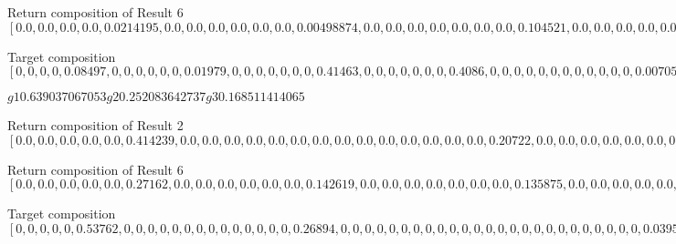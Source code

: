 Return composition of Result 6
$[0.0, 0.0, 0.0, 0.0, 0.0214195, 0.0, 0.0, 0.0, 0.0, 0.0, 0.0, 0.00498874, 0.0, 0.0, 0.0, 0.0, 0.0, 0.0, 0.0, 0.104521, 0.0, 0.0, 0.0, 0.0, 0.0, 0.0, 0.0, 0.103001, 0.0, 0.0, 0.0, 0.0, 0.0, 0.0, 0.0, 0.0, 0.0, 0.0, 0.0, 0.0, 0.00177719, 0.0, 0.0, 0.0, 0.0, 0.0, 0.0163754, 0.0, 0.0, 0.0, 0.0, 0.0, 0.0, 0.0, 0.747916]$

Target composition
$[0, 0, 0, 0, 0.08497, 0, 0, 0, 0, 0, 0, 0.01979, 0, 0, 0, 0, 0, 0, 0, 0.41463, 0, 0, 0, 0, 0, 0, 0, 0.4086, 0, 0, 0, 0, 0, 0, 0, 0, 0, 0, 0, 0, 0.00705, 0, 0, 0, 0, 0, 0.06496, 0, 0, 0, 0, 0, 0, 0]$

$g1 0.639037067053 g2 0.252083642737 g3 0.168511414065$





Return composition of Result 2
$[0.0, 0.0, 0.0, 0.0, 0.0, 0.414239, 0.0, 0.0, 0.0, 0.0, 0.0, 0.0, 0.0, 0.0, 0.0, 0.0, 0.0, 0.0, 0.0, 0.0, 0.20722, 0.0, 0.0, 0.0, 0.0, 0.0, 0.0, 0.0, 0.0, 0.0, 0.0, 0.0, 0.0, 0.0, 0.0, 0.0, 0.0, 0.0, 0.0, 0.0, 0.0, 0.0, 0.0, 0.0304427, 0.0, 0.0, 0.0, 0.0, 0.0, 0.0, 0.0, 0.0, 0.0, 0.0, 0.0, 0.0, 0.0876989, 0.0, 0.0, 0.0, 0.0, 0.0, 0.0, 0.0, 0.0, 0.0, 0.0, 0.0, 0.0, 0.0, 0.0, 0.0, 0.0, 0.0, 0.0, 0.0, 0.0123589, 0.0, 0.0, 0.0, 0.0, 0.0, 0.0, 0.0, 0.0, 0.0, 0.0, 0.0, 0.0, 0.0, 0.0, 0.0, 0.0185461, 0.0, 0.0, 0.0, 0.0, 0.0, 0.0, 0.0, 0.0, 0.0, 0.0, 0.0, 0.0, 0.0, 0.0, 0.0, 0.229495]$

Return composition of Result 6
$[0.0, 0.0, 0.0, 0.0, 0.0, 0.27162, 0.0, 0.0, 0.0, 0.0, 0.0, 0.0, 0.142619, 0.0, 0.0, 0.0, 0.0, 0.0, 0.0, 0.0, 0.135875, 0.0, 0.0, 0.0, 0.0, 0.0, 0.0, 0.0, 0.0, 0.0, 0.0, 0.0, 0.0, 0.0713442, 0.0, 0.0, 0.0, 0.0, 0.0, 0.0, 0.0, 0.0, 0.0, 0.0104812, 0.0, 0.0, 0.0199615, 0.0, 0.0, 0.0, 0.0, 0.0, 0.0, 0.0, 0.0, 0.0, 0.0301941, 0.0, 0.0, 0.0, 0.0, 0.0, 0.0, 0.0, 0.0, 0.0, 0.0, 0.0, 0.0, 0.0575048, 0.0, 0.0, 0.0, 0.0, 0.0, 0.0, 0.00810383, 0.0, 0.0, 0.0, 0.0, 0.0, 0.0, 0.0, 0.0, 0.00425508, 0.0, 0.0, 0.0, 0.0, 0.0, 0.0, 0.0121608, 0.0, 0.0, 0.0, 0.0, 0.0, 0.0, 0.0, 0.0, 0.0, 0.0, 0.0, 0.0, 0.00638527, 0.0, 0.0, 0.229495]$

Target composition
$[0, 0, 0, 0, 0, 0.53762, 0, 0, 0, 0, 0, 0, 0, 0, 0, 0, 0, 0, 0, 0, 0.26894, 0, 0, 0, 0, 0, 0, 0, 0, 0, 0, 0, 0, 0, 0, 0, 0, 0, 0, 0, 0, 0, 0, 0, 0, 0, 0.03951, 0, 0, 0, 0, 0, 0, 0, 0, 0, 0, 0, 0, 0, 0, 0, 0, 0, 0, 0, 0, 0, 0, 0.11382, 0, 0, 0, 0, 0, 0, 0.01604, 0, 0, 0, 0, 0, 0, 0, 0, 0, 0, 0, 0, 0, 0, 0, 0.02407, 0, 0, 0, 0, 0, 0, 0, 0, 0, 0, 0, 0, 0, 0, 0]$

